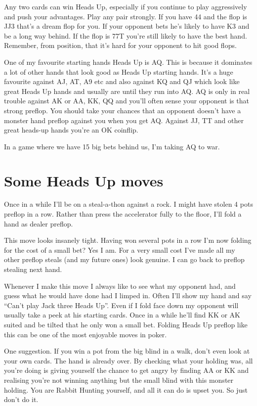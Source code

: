 Any two cards can win Heads Up, especially if you continue
to play aggressively and push your advantages. Play any
pair strongly. If you have 44 and the flop is JJ3 that's
a dream flop for you. If your opponent bets he's likely
to have K3 and be a long way behind. If the flop is 77T
you're still likely to have the best hand. Remember,
from position, that it's hard for your opponent to
hit good flops.

One of my favourite starting hands Heads Up is AQ.
This is because it dominates a lot of other hands
that look good as Heads Up starting hands.
It's a huge favourite against AJ, AT, A9 etc and also
against KQ and QJ which look like great Heads Up hands
and usually are until they run into AQ. AQ is only in
real trouble against AK or AA, KK, QQ and you'll often
sense your opponent is that strong preflop. You should
take your chances that an opponent doesn't have a monster
hand preflop against you when you get AQ. Against JJ, TT
and other great heads-up hands you're an OK coinflip.

In a game where we have 15 big bets behind us, I'm
taking AQ to war.

\section{Some Heads Up moves}

Once in a while I'll be on a steal-a-thon against
a rock. I might have stolen 4 pots preflop in a row.
Rather than press the accelerator fully to the floor,
I'll fold a hand as dealer preflop.

This move looks insanely tight. Having won several
pots in a row I'm now folding for the cost of a small bet?
Yes I am. For a very small cost I've made all my other
preflop steals (and my future ones) look genuine. I can go
back to preflop stealing next hand.

Whenever I make this move I always like to see what
my opponent had, and guess what he would have done had
I limped in. Often I'll show my hand and say ``Can't play
Jack three Heads Up''. Even if I fold face down my opponent
will usually take a peek at his starting cards. Once
in a while he'll find KK or AK suited and be tilted
that he only won a small bet. Folding Heads Up preflop
like this can be one of the most enjoyable moves in poker.

One suggestion. If you win a pot from the big blind in a walk,
don't even look at your own cards. The hand is already over. By
checking what your holding was, all you're doing is giving yourself
the chance to get angry by finding AA or KK and realising you're not
winning anything but the small blind with this monster holding.
You are Rabbit Hunting yourself, and all it can do is upset you. So
just don't do it.

